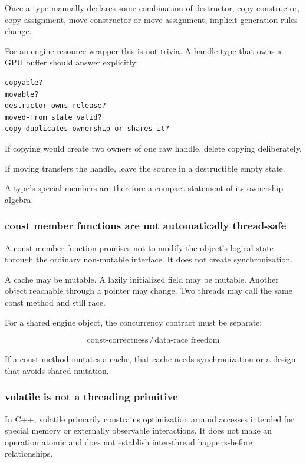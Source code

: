 Once a type manually declares some combination of destructor, copy constructor, copy assignment, move constructor or move assignment, implicit generation rules change.

For an engine resource wrapper this is not trivia. A handle type that owns a GPU buffer should answer explicitly:

\begin{verbatim}
copyable?
movable?
destructor owns release?
moved-from state valid?
copy duplicates ownership or shares it?
\end{verbatim}

If copying would create two owners of one raw handle, delete copying deliberately.

If moving transfers the handle, leave the source in a destructible empty state.

A type's special members are therefore a compact statement of its ownership algebra.

\subsubsection{const member functions are not automatically thread-safe}\label{01-foundations-i-ch005-const-member-functions-are-not-automatically-thread-safe}

A const member function promises not to modify the object's logical state through the ordinary non-mutable interface. It does not create synchronization.

A cache may be mutable. A lazily initialized field may be mutable. Another object reachable through a pointer may change. Two threads may call the same const method and still race.

For a shared engine object, the concurrency contract must be separate:

\[
\boxed{
\text{const-correctness}
\neq
\text{data-race freedom}
}
\]

If a const method mutates a cache, that cache needs synchronization or a design that avoids shared mutation.

\subsubsection{volatile is not a threading primitive}\label{01-foundations-i-ch005-volatile-is-not-a-threading-primitive}

In C++, volatile primarily constrains optimization around accesses intended for special memory or externally observable interactions. It does not make an operation atomic and does not establish inter-thread happens-before relationships.

